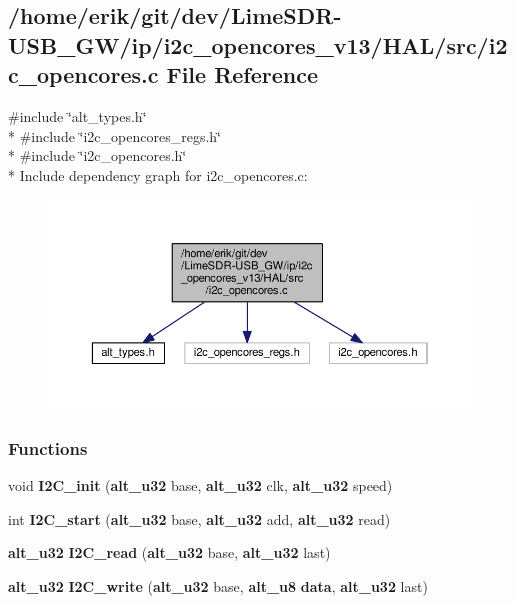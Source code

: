 \subsection{/home/erik/git/dev/\+Lime\+S\+D\+R-\/\+U\+S\+B\+\_\+\+G\+W/ip/i2c\+\_\+opencores\+\_\+v13/\+H\+A\+L/src/i2c\+\_\+opencores.c File Reference}
\label{ip_2i2c__opencores__v13_2HAL_2src_2i2c__opencores_8c}
{\ttfamily \#include \char`\"{}alt\+\_\+types.\+h\char`\"{}}\\*
{\ttfamily \#include \char`\"{}i2c\+\_\+opencores\+\_\+regs.\+h\char`\"{}}\\*
{\ttfamily \#include \char`\"{}i2c\+\_\+opencores.\+h\char`\"{}}\\*
Include dependency graph for i2c\+\_\+opencores.\+c\+:
\nopagebreak
\begin{figure}[H]
\begin{center}
\leavevmode
\includegraphics[width=350pt]{d8/d60/ip_2i2c__opencores__v13_2HAL_2src_2i2c__opencores_8c__incl}
\end{center}
\end{figure}
\subsubsection*{Functions}
\begin{DoxyCompactItemize}
\item 
void {\bf I2\+C\+\_\+init} ({\bf alt\+\_\+u32} base, {\bf alt\+\_\+u32} clk, {\bf alt\+\_\+u32} speed)
\item 
int {\bf I2\+C\+\_\+start} ({\bf alt\+\_\+u32} base, {\bf alt\+\_\+u32} add, {\bf alt\+\_\+u32} read)
\item 
{\bf alt\+\_\+u32} {\bf I2\+C\+\_\+read} ({\bf alt\+\_\+u32} base, {\bf alt\+\_\+u32} last)
\item 
{\bf alt\+\_\+u32} {\bf I2\+C\+\_\+write} ({\bf alt\+\_\+u32} base, {\bf alt\+\_\+u8} {\bf data}, {\bf alt\+\_\+u32} last)
\end{DoxyCompactItemize}


